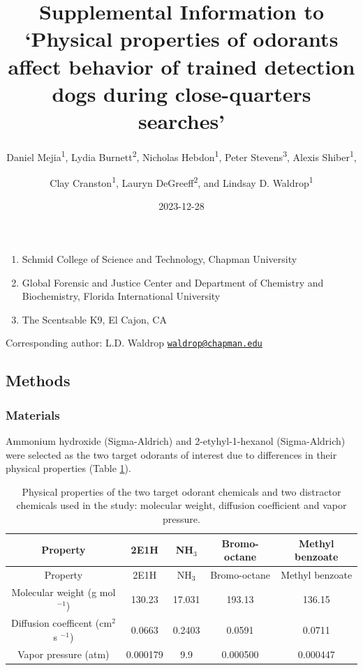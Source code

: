 \documentclass[
]{article}
\title{Supplemental Information to `Physical properties of odorants affect behavior of trained detection dogs during close-quarters searches'}
\author{Daniel Mejia\textsuperscript{1}, Lydia Burnett\textsuperscript{2}, Nicholas Hebdon\textsuperscript{1}, Peter Stevens\textsuperscript{3}, Alexis Shiber\textsuperscript{1}, \and Clay Cranston\textsuperscript{1}, Lauryn DeGreeff\textsuperscript{2}, and Lindsay D. Waldrop\textsuperscript{1}}
\date{2023-12-28}
\providecommand{\tightlist}{%
  \setlength{\itemsep}{0pt}\setlength{\parskip}{0pt}}
\begin{document}
\maketitle

\begin{enumerate}
\def\labelenumi{\arabic{enumi}.}
\tightlist
\item
  Schmid College of Science and Technology, Chapman University
\item
  Global Forensic and Justice Center and Department of Chemistry and Biochemistry, Florida International University
\item
  The Scentsable K9, El Cajon, CA
\end{enumerate}

Corresponding author: L.D. Waldrop \href{mailto:waldrop@chapman.edu}{\nolinkurl{waldrop@chapman.edu}}

\hypertarget{methods}{%
\subsection{Methods}\label{methods}}

\hypertarget{materials}{%
\subsubsection{Materials}\label{materials}}

Ammonium hydroxide (Sigma-Aldrich) and 2-etyhyl-1-hexanol (Sigma-Aldrich) were selected as the two target odorants of interest due to differences in their physical properties (Table \ref{tab:chem-table}).

\begin{longtable}[]{@{}ccccc@{}}
\caption{\label{tab:chem-table}Physical properties of the two target odorant chemicals and two distractor chemicals used in the study: molecular weight, diffusion coefficient and vapor pressure.}\tabularnewline
\toprule\noalign{}
Property & 2E1H & NH\(_3\) & Bromo-octane & Methyl benzoate \\
\midrule\noalign{}
\endfirsthead
\toprule\noalign{}
Property & 2E1H & NH\(_3\) & Bromo-octane & Methyl benzoate \\
\midrule\noalign{}
\endhead
\bottomrule\noalign{}
\endlastfoot
Molecular weight (g mol\(^{-1}\)) & 130.23 & 17.031 & 193.13 & 136.15 \\
Diffusion coefficent (cm\(^2\) s \(^{-1}\)) & 0.0663 & 0.2403 & 0.0591 & 0.0711 \\
Vapor pressure (atm) & 0.000179 & 9.9 & 0.000500 & 0.000447 \\
\end{longtable}
\end{document}
